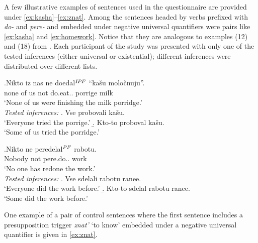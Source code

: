 A few illustrative examples of sentences used in the questionnaire are provided under \ref{ex:kasha}--\ref{ex:znat}. Among the sentences headed by verbs prefixed with \textit{do-} and \textit{pere-} and embedded under negative universal quantifiers were pairs like \ref{ex:kasha} and \ref{ex:homework}. Notice that they are analogous to examples (12) and (18) from \citealt{Chemla:09}. Each participant  of the study was presented with only one of the tested inferences (either universal or existential); different inferences were distributed over different lists.

\exg.\label{ex:kasha}Nikto iz nas ne doedal$^{\mathit{IPF}}$ ``ka\v{s}u molo\v{c}nuju''.\\
none of us not do.eat.. porrige milk\\
\vspace{0.5em}
`None of us were finishing the milk porridge.'\\
\textit{Tested inferences:}
\a. Vse probovali ka\v{s}u.\\
`Everyone tried the porrige.'
\b. Kto-to proboval ka\v{s}u.\\
`Some of us tried the porridge.'


\exg.\label{ex:homework}Nikto ne peredelal$^{\mathit{PF}}$ rabotu.\\
Nobody not pere.do.. work\\
\vspace{0.5em}
`No one has redone the work.'\\
\textit{Tested inferences:}
\a. \label{test:homework1}Vse sdelali rabotu ranee.\\
`Everyone did the work before.'
\b. \label{test:homework2}Kto-to sdelal rabotu ranee.\\
`Some did the work before.'


One example of a pair of control sentences where the first sentence includes a presupposition trigger \textit{znat'} `to know' embedded under a negative universal quantifier is given in \ref{ex:znat}.

